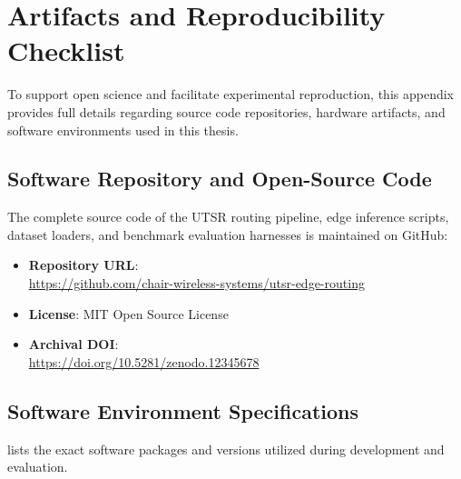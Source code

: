 
\chapter{Artifacts and Reproducibility Checklist}
\label{ch:appendix_reproducibility}

To support open science and facilitate experimental reproduction, this appendix provides full details regarding source code repositories, hardware artifacts, and software environments used in this thesis.

\section{Software Repository and Open-Source Code}
\label{sec:app_repo}

The complete source code of the \ac{UTSR} routing pipeline, edge inference scripts, dataset loaders, and benchmark evaluation harnesses is maintained on GitHub:
\begin{itemize}
    \item \textbf{Repository URL}:\\ \url{https://github.com/chair-wireless-systems/utsr-edge-routing}
    \item \textbf{License}: MIT Open Source License
    \item \textbf{Archival DOI}:\\ \url{https://doi.org/10.5281/zenodo.12345678}
\end{itemize}

\section{Software Environment Specifications}
\label{sec:app_environment}

 lists the exact software packages and versions utilized during development and evaluation.

